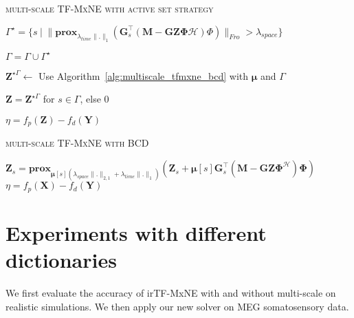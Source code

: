 {\fontsize{4}{4}\selectfont
\begin{algorithm}[t]
\caption{\textsc{multi-scale TF-MxNE with active set strategy}}
\While{
		$\eta \geq \epsilon$
	  }
	  {
	  	$\Gamma^\star = \{s \hspace{3pt} | \hspace{3pt} \|\textbf{prox}_{\lambda_{time}\|.\|_1}(\mathbf{G}_s^\top(\mathbf{M}-\mathbf{GZ\Phi}\mathcal{H})\Phi)\|_{Fro} > \lambda_{space} \}$
	  	
	  	$\Gamma = \Gamma \cup \Gamma^\star$
	  	
	  	$\mathbf{Z}^{\star\Gamma}\leftarrow$ Use Algorithm~\ref{alg:multiscale_tfmxne_bcd} with $\mathbf{\mu}$ and $\Gamma$
	  	
	  	$\mathbf{Z}=\mathbf{Z}^{\star\Gamma}$ for $s\in\Gamma$, else 0

	  	$\eta=f_p(\mathbf{Z})-f_d(\mathbf{Y})$
	  }
\label{alg:multiscale_tfmxne_activeset}
\end{algorithm}
}

{\fontsize{4}{4}\selectfont
\begin{algorithm}[t]
\caption{\textsc{multi-scale TF-MxNE with BCD}}
\While{
		$\eta \geq \epsilon$
	  }
	  {
	  		{
	  			$\mathbf{Z}_s = \textbf{prox}_{\mathbf{\mu}[s](\lambda_{space}\|.\|_{2,1}+\lambda_{time}\|.\|_1)}(\mathbf{Z}_s+\mathbf{\mu}[s]\mathbf{G}^\top_s(\mathbf{M}-\mathbf{GZ\Phi}^\mathcal{H})\mathbf{\Phi})$
	  		}
	  	$\eta = f_p(\mathbf{X})-f_d(\mathbf{Y})$
	  }
\label{alg:multiscale_tfmxne_bcd}
\end{algorithm}
}


\section{Experiments with different dictionaries}
We first evaluate the accuracy of irTF-MxNE with and without multi-scale on realistic simulations. We then apply our new solver on MEG somatosensory data.

